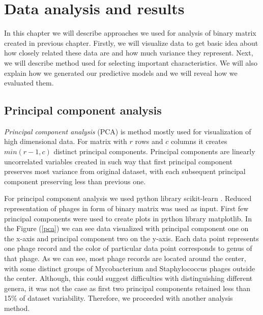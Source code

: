 \chapter{Data analysis and results}
In this chapter we will describe approaches we used for analysis of binary matrix created in previous chapter. 
Firstly, we will visualize data to get basic idea about how closely related these data are and how much variance they represent.
Next, we will describe method used for selecting important characteristics.
We will also explain how we generated our predictive models and we will reveal how we evaluated them.

\section{Principal component analysis}
\emph{Principal component analysis} (PCA) is method mostly used for visualization of high dimensional data.
For matrix with $r$ rows and $c$ columns it creates $min(r-1, c)$ distinct principal components.
Principal components are linearly uncorrelated variables created in such way that first principal component preserves most variance from original dataset, with each subsequent principal component preserving less than previous one.

For principal component analysis we used python library scikit-learn \cite{sklearn}.
Reduced representation of phages in form of binary matrix was used as input.
First few principal components were used to create plots in python library matplotlib.
In the Figure (\ref{pca}) we can see data visualized with principal component one on the x-axis and principal component two on the y-axis.
Each data point represents one phage record and the color of particular data point corresponds to genus of that phage.
As we can see, most phage records are located around the center, with some distinct groups of Mycobacterium and Staphylococcus phages outside the center.
Although, this could suggest difficulties with distinguishing different genera, it was not the case as first two principal components retained less than 15\% of dataset variability.
Therefore, we proceeded with another analysis method.

